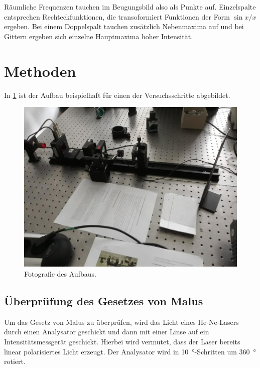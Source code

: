 \documentclass[
	a4paper,
	12pt,
	pagesize,
	ngerman
]{scrartcl}
\begin{document}
	Räumliche Frequenzen tauchen im Beugungsbild also als Punkte auf.
	Einzelspalte entsprechen Rechteckfunktionen, die transoformiert Funktionen der Form $\sin{x}/x$ ergeben.
	Bei einem Doppelspalt tauchen zusätzlich Nebenmaxima auf und bei Gittern ergeben sich einzelne Hauptmaxima hoher Intensität. %

	\section{Methoden}
	In \cref{fig_Aufbau} ist der Aufbau beispielhaft für einen der Versuchsschritte abgebildet.

	\begin{figure}[H]
				\includegraphics[width=0.7\linewidth]{img/aufbau}
				\caption{
				Fotografie des Aufbaus.
				}
				\label{fig_Aufbau}
		\end{figure}


	\subsection{Überprüfung des Gesetzes von Malus}
	Um das Gesetz von Malus zu überprüfen, wird das Licht eines He-Ne-Lasers durch einen Analysator geschickt und dann mit einer Linse auf ein Intensitätsmessgerät geschickt. %
	Hierbei wird vermutet, dass der Laser bereits linear polarisiertes Licht erzeugt.
	Der Analysator wird in \SI{10}{\degree}-Schritten um \SI{360}{\degree} rotiert.
\end{document}
